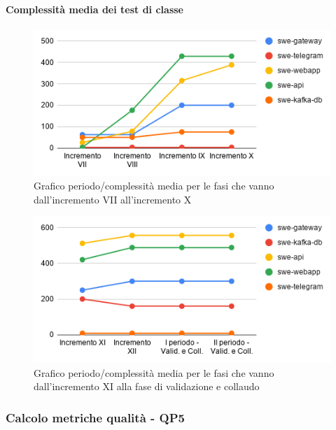 \paragraph{Complessità media dei test di classe}
	\begin{figure}[H]
			\centering
			\includegraphics[width=0.8\linewidth]{./res/images/QM-TEST-7-CMTC.png}
			\caption{Grafico periodo/complessità media per le fasi che vanno dall'incremento VII all'incremento X}
			\label{fig:Grafico periodo/complessità media per le fasi che vanno dall'incremento VII all'incremento X}
	\end{figure}
	\begin{figure}[H]
			\centering
			\includegraphics[width=0.8\linewidth]{./res/images/QM-TEST-7-CMTC_1.png}
			\caption{Grafico periodo/complessità media per le fasi che vanno dall'incremento XI alla fase di validazione e collaudo}
			\label{fig:Grafico periodo/complessità media per le fasi che vanno dall'incremento XI alla fase di validazione e collaudo}
	\end{figure}


\subsubsection{Calcolo metriche qualità - QP5}
